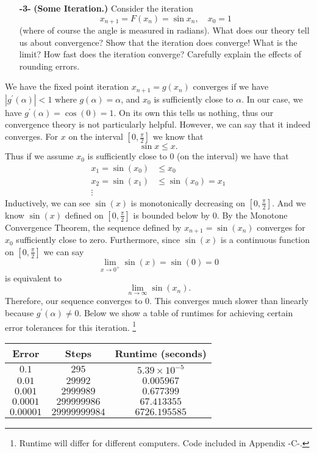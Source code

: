 \documentclass[11pt]{article}
\theoremstyle{definition}
\newcommand{\1}[1]{\mathbf{1} \left \{ #1 \right \}}
\begin{document}
\begin{itemize}
    \item[{\textbf{-3-}}] \textbf{(Some Iteration.)}  Consider the iteration
    \begin{equation}
        x_{n+1} = F(x_n) = \sin x_n, \quad x_0 = 1
    \end{equation}
    (where of course the angle is measured in radians).  What does our theory tell us about convergence? Show that the iteration does converge!  What is the limit?  How fast does the iteration converge?  Carefully explain the effects of rounding errors.
\end{itemize}
We have the fixed point iteration $x_{n+1} = g(x_n)$ converges if we have \(\left|g^{\prime} (\alpha)\right| < 1\) where $g(\alpha) = \alpha$, and $x_0$ is sufficiently close to $\alpha$.  In our case, we have $g^{\prime} (\alpha) = \cos (0) = 1$.  On its own this tells us nothing, thus our convergence theory is not particularly helpful.  However, we can say that it indeed converges.  For $x$ on the interval $[0, \frac{\pi}{2}]$ we know that
\[\sin x \leq x.\]
Thus if we assume $x_0$ is sufficiently close to $0$ (on the interval) we have that
\begin{equation*}
    \begin{split}
        x_1 = \sin (x_0) &\leq x_0 \\
        x_2 = \sin (x_1) &\leq \sin (x_0) = x_1 \\
        \vdots
    \end{split}
\end{equation*}
Inductively, we can see $\sin(x)$ is monotonically decreasing on $[0, \frac{\pi}{2}]$.  And we know $\sin(x)$ defined on $[0, \frac{\pi}{2}]$ is bounded below by $0$.  By the Monotone Convergence Theorem, the sequence defined by $x_{n+1} = \sin(x_n)$ converges for $x_0$ sufficiently close to zero.  Furthermore, since $\sin(x)$ is a continuous function on $[0, \frac{\pi}{2}]$ we can say
\[\lim_{x \rightarrow 0^+} \sin (x) = \sin (0) = 0\]
is equivalent to
\[\lim_{n \rightarrow \infty} \sin (x_n).\]
Therefore, our sequence converges to $0$.  This converges much slower than linearly because $g^{\prime} (\alpha) \neq 0$.  Below we show a table of runtimes for achieving certain error tolerances for this iteration.  \footnote{Runtime will differ for different computers.  Code included in Appendix -C-.}
\begin{center}
\begin{tabular}{ |c|c|c| }
\hline
Error & Steps & Runtime (seconds) \\
\hline
$0.1$ & $295$ & $5.39 \times 10^{-5}$ \\
$0.01$ & $29992$ & $0.005967$ \\
$0.001$ & $2999989$ & $0.677399$ \\
$0.0001$ & $299999986$ & $67.413355$ \\
$0.00001$ & $29999999984$ & $6726.195585$ \\
\hline
\end{tabular}
\end{center}
\end{document}
